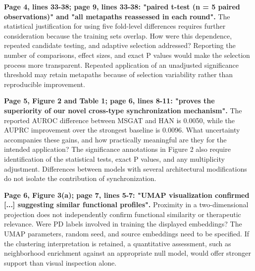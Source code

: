 \documentclass[11pt,american]{article}
\begin{document}
\begin{revresponse}

\end{revresponse}

\begin{revcomment}
\textbf{Page 4, lines 33-38; page 9, lines 33-38: "paired t-test (n = 5 paired observations)" and "all metapaths reassessed in each round".} The statistical justification for using five fold-level differences requires further consideration because the training sets overlap. How were this dependence, repeated candidate testing, and adaptive selection addressed? Reporting the number of comparisons, effect sizes, and exact P values would make the selection process more transparent. Repeated application of an unadjusted significance threshold may retain metapaths because of selection variability rather than reproducible improvement.
\end{revcomment}

\begin{revresponse}

\end{revresponse}

\begin{revcomment}
\textbf{Page 5, Figure 2 and Table 1; page 6, lines 8-11: "proves the superiority of our novel cross-type synchronization mechanism".} The reported AUROC difference between MSGAT and HAN is 0.0050, while the AUPRC improvement over the strongest baseline is 0.0096. What uncertainty accompanies these gains, and how practically meaningful are they for the intended application? The significance annotations in Figure 2 also require identification of the statistical tests, exact P values, and any multiplicity adjustment. Differences between models with several architectural modifications do not isolate the contribution of synchronization.
\end{revcomment}

\begin{revresponse}

\end{revresponse}

\begin{revcomment}
\textbf{Page 6, Figure 3(a); page 7, lines 5-7: "UMAP visualization confirmed [...] suggesting similar functional profiles".} Proximity in a two-dimensional projection does not independently confirm functional similarity or therapeutic relevance. Were PD labels involved in training the displayed embeddings? The UMAP parameters, random seed, and source embeddings need to be specified. If the clustering interpretation is retained, a quantitative assessment, such as neighborhood enrichment against an appropriate null model, would offer stronger support than visual inspection alone.
\end{revcomment}
\end{document}
